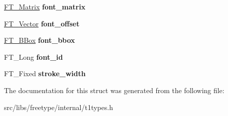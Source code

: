 \begin{DoxyCompactItemize}
\item 
\hypertarget{struct_t1___font_rec___a87c95f084851d2bb9e48889e9444b2a8}{
\hyperlink{struct_f_t___matrix__}{FT\_\-Matrix} {\bfseries font\_\-matrix}}
\label{struct_t1___font_rec___a87c95f084851d2bb9e48889e9444b2a8}

\item 
\hypertarget{struct_t1___font_rec___ab6e773e20df1c585dc14ee3fa7ed1737}{
\hyperlink{struct_f_t___vector__}{FT\_\-Vector} {\bfseries font\_\-offset}}
\label{struct_t1___font_rec___ab6e773e20df1c585dc14ee3fa7ed1737}

\item 
\hypertarget{struct_t1___font_rec___a86fd1af4c03e34b7d151054ccc7525a7}{
\hyperlink{struct_f_t___b_box__}{FT\_\-BBox} {\bfseries font\_\-bbox}}
\label{struct_t1___font_rec___a86fd1af4c03e34b7d151054ccc7525a7}

\item 
\hypertarget{struct_t1___font_rec___a14178cf438d1a5fcb31b7d398d06cfaf}{
FT\_\-Long {\bfseries font\_\-id}}
\label{struct_t1___font_rec___a14178cf438d1a5fcb31b7d398d06cfaf}

\item 
\hypertarget{struct_t1___font_rec___ac71ace1872be6b2adbd3d6f5ca456d23}{
FT\_\-Fixed {\bfseries stroke\_\-width}}
\label{struct_t1___font_rec___ac71ace1872be6b2adbd3d6f5ca456d23}

\end{DoxyCompactItemize}


The documentation for this struct was generated from the following file:\begin{DoxyCompactItemize}
\item 
src/libs/freetype/internal/t1types.h\end{DoxyCompactItemize}
